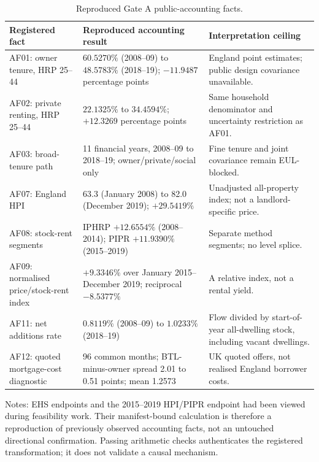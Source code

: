 \begin{table}[t]
  \centering
  \caption{Reproduced Gate A public-accounting facts.}
  \label{tab:accounting-facts}
  \small
  \begin{tabular}{@{}p{}p{}p{}@{}}
    \toprule
    Registered fact & Reproduced accounting result & Interpretation ceiling \\
    \midrule
    AF01: owner tenure, HRP 25--44
      & $60.5270\%$ (2008--09) to $48.5783\%$ (2018--19); $-11.9487$ percentage points
      & England point estimates; public design covariance unavailable. \\
    AF02: private renting, HRP 25--44
      & $22.1325\%$ to $34.4594\%$; $+12.3269$ percentage points
      & Same household denominator and uncertainty restriction as AF01. \\
    AF03: broad-tenure path
      & 11 financial years, 2008--09 to 2018--19; owner/private/social only
      & Fine tenure and joint covariance remain EUL-blocked. \\
    AF07: England HPI
      & 63.3 (January 2008) to 82.0 (December 2019); $+29.5419\%$
      & Unadjusted all-property index; not a landlord-specific price. \\
    AF08: stock-rent segments
      & IPHRP $+12.6554\%$ (2008--2014); PIPR $+11.9390\%$ (2015--2019)
      & Separate method segments; no level splice. \\
    AF09: normalised price/stock-rent index
      & $+9.3346\%$ over January 2015--December 2019; reciprocal $-8.5377\%$
      & A relative index, not a rental yield. \\
    AF11: net additions rate
      & $0.8119\%$ (2008--09) to $1.0233\%$ (2018--19)
      & Flow divided by start-of-year all-dwelling stock, including vacant dwellings. \\
    AF12: quoted mortgage-cost diagnostic
      & 96 common months; BTL-minus-owner spread 2.01 to 0.51 points; mean 1.2573
      & UK quoted offers, not realised England borrower costs. \\
    \bottomrule
  \end{tabular}
  \parbox{0.96\textwidth}{\footnotesize
    Notes: EHS endpoints and the 2015--2019 HPI/PIPR endpoint had been viewed
    during feasibility work.  Their manifest-bound calculation is therefore a
    reproduction of previously observed accounting facts, not an untouched
    directional confirmation.  Passing arithmetic checks authenticates the
    registered transformation; it does not validate a causal mechanism.}
\end{table}

